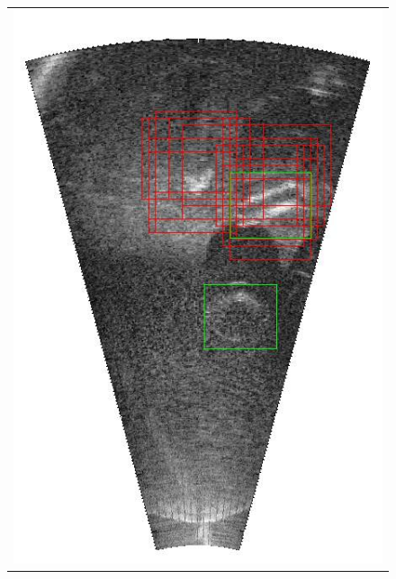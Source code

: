 \begin{figure}[!p]
{\begin{tabular}[b]{c}
		\includegraphics[height=0.2\textheight]{chapters/images/proposals/errors/fcn-2016-02-11_070611-frame02478-proposals.jpg}

\end{tabular}}
\end{figure}
